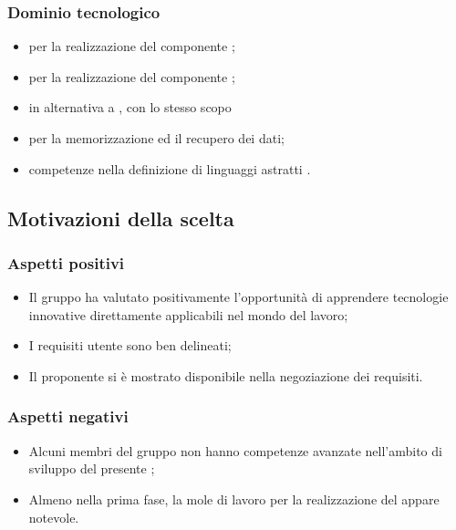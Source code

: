 \subsubsection{Dominio tecnologico}
\begin{itemize}
\item {} per la realizzazione del componente ;
\item {} per la realizzazione del componente ;
\item {} in alternativa a , con lo stesso scopo
\item {} per la memorizzazione ed il recupero dei dati;
\item competenze nella definizione di linguaggi astratti .
\end{itemize}


\subsection{Motivazioni della scelta}
\subsubsection{Aspetti positivi}
\begin{itemize}
\item Il gruppo ha valutato positivamente l'opportunit\`a di apprendere tecnologie innovative
  direttamente applicabili nel mondo del lavoro;
\item I requisiti utente sono ben delineati;
\item Il proponente si \`e mostrato disponibile nella negoziazione dei requisiti.
\end{itemize}

\subsubsection{Aspetti negativi}
\begin{itemize}
\item Alcuni membri del gruppo non hanno competenze avanzate nell'ambito di sviluppo del presente ;
\item Almeno nella prima fase, la mole di lavoro per la realizzazione del  appare notevole.
\end{itemize}



